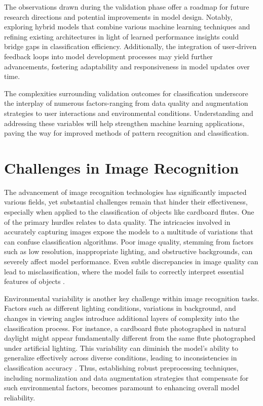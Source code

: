 The observations drawn during the validation phase offer a roadmap for future research directions and potential improvements in model design. Notably, exploring hybrid models that combine various machine learning techniques and refining existing architectures in light of learned performance insights could bridge gaps in classification efficiency. Additionally, the integration of user-driven feedback loops into model development processes may yield further advancements, fostering adaptability and responsiveness in model updates over time.


The complexities surrounding validation outcomes for classification underscore the interplay of numerous factors-ranging from data quality and augmentation strategies to user interactions and environmental conditions. Understanding and addressing these variables will help strengthen machine learning applications, paving the way for improved methods of pattern recognition and classification.

\section{Challenges in Image Recognition}
The advancement of image recognition technologies has significantly impacted various fields, yet substantial challenges remain that hinder their effectiveness, especially when applied to the classification of objects like cardboard flutes. One of the primary hurdles relates to data quality. The intricacies involved in accurately capturing images expose the models to a multitude of variations that can confuse classification algorithms. Poor image quality, stemming from factors such as low resolution, inappropriate lighting, and obstructive backgrounds, can severely affect model performance. Even subtle discrepancies in image quality can lead to misclassification, where the model fails to correctly interpret essential features of objects \cite{krizhevsky2012imagenet}.


Environmental variability is another key challenge within image recognition tasks. Factors such as different lighting conditions, variations in background, and changes in viewing angles introduce additional layers of complexity into the classification process. For instance, a cardboard flute photographed in natural daylight might appear fundamentally different from the same flute photographed under artificial lighting. This variability can diminish the model's ability to generalize effectively across diverse conditions, leading to inconsistencies in classification accuracy \cite{huang2017densely}. Thus, establishing robust preprocessing techniques, including normalization and data augmentation strategies that compensate for such environmental factors, becomes paramount to enhancing overall model reliability.


